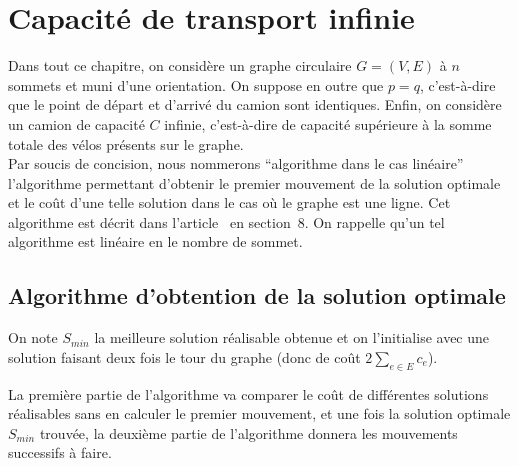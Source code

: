 \chapter{Capacité de transport infinie}
\label{Capacité infinie}

Dans tout ce chapitre, on considère un graphe circulaire $G = (V,E)$ à $n$ sommets et muni d'une orientation. On suppose en outre que $p=q$, c'est-à-dire que le point de départ et d'arrivé du camion sont identiques. Enfin, on considère un camion de capacité $C$ infinie, c'est-à-dire de capacité supérieure à la somme totale des vélos présents sur le graphe.
\\

Par soucis de concision, nous nommerons ``algorithme dans le cas linéaire'' l'algorithme permettant d'obtenir le premier mouvement de la solution optimale et le coût d'une telle solution dans le cas où le graphe est une ligne. Cet algorithme est décrit dans l'article~\cite{Benchimol2011} en section~8. On rappelle qu'un tel algorithme est linéaire en le nombre de sommet.

\section{Algorithme d'obtention de la solution optimale}
\label{Algorithme circulaire infini}

On note $S_{min}$ la meilleure solution réalisable obtenue et on l'initialise avec une solution faisant deux fois le tour du graphe (donc de coût $2\sum_{e \in E}c_e$).

La première partie de l'algorithme va comparer le coût de différentes solutions réalisables sans en calculer le premier mouvement, et une fois la solution optimale $S_{min}$ trouvée, la deuxième partie de l'algorithme donnera les mouvements successifs à faire.
\\

